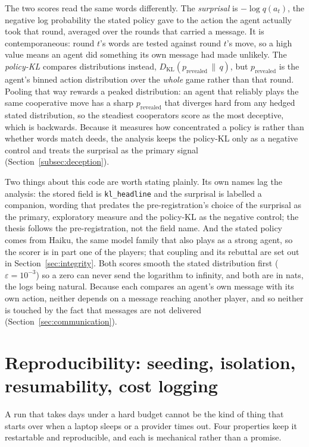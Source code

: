The two scores read the same words differently. The \emph{surprisal} is \(-\log
q(a_t)\), the negative log probability the stated policy gave to the action the agent
actually took that round, averaged over the rounds that carried a message. It is
contemporaneous: round \(t\)'s words are tested against round \(t\)'s move, so a high
value means an agent did something its own message had made unlikely. The
\emph{policy-KL} compares distributions instead, \(D_{\mathrm{KL}}(p_{\mathrm{revealed}}
\,\|\, q)\), but \(p_{\mathrm{revealed}}\) is the agent's binned action distribution over
the \emph{whole} game rather than that round. Pooling that way rewards a peaked
distribution: an agent that reliably plays the same cooperative move has a sharp
\(p_{\mathrm{revealed}}\) that diverges hard from any hedged stated distribution, so the
steadiest cooperators score as the most deceptive, which is backwards. Because it
measures how concentrated a policy is rather than whether words match deeds, the
analysis keeps the policy-KL only as a negative control and treats the surprisal as the
primary signal (Section~\ref{subsec:deception}).

Two things about this code are worth stating plainly. Its own names lag the analysis:
the stored field is \texttt{kl\_headline} and the surprisal is labelled a companion,
wording that predates the pre-registration's choice of the surprisal as the primary,
exploratory measure and the policy-KL as the negative control; the thesis follows the
pre-registration, not the field name. And the stated policy comes from Haiku, the same model family that also plays as a
strong agent, so the scorer is in part one of the players; that coupling and its
rebuttal are set out in Section~\ref{sec:integrity}. Both scores smooth the stated
distribution first (\(\varepsilon = 10^{-3}\)) so a zero can never send the logarithm to
infinity, and both are in nats, the logs being natural. Because each compares an agent's
own message with its own action, neither depends on a message reaching another player,
and so neither is touched by the fact that messages are not delivered
(Section~\ref{sec:communication}).

\section{Reproducibility: seeding, isolation, resumability, cost logging}
\label{sec:repro}

A run that takes days under a hard budget cannot be the kind of thing that starts over
when a laptop sleeps or a provider times out. Four properties keep it restartable and
reproducible, and each is mechanical rather than a promise.

